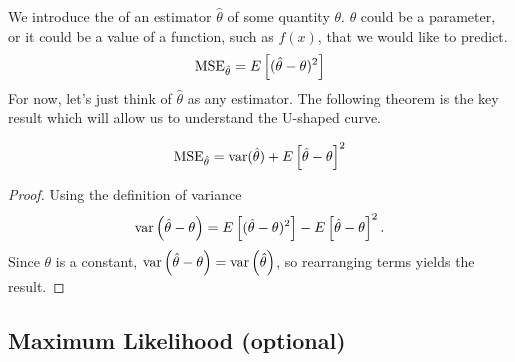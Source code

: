 We introduce the  of an estimator $\hat{\theta}$ of some quantity $\theta$. $\theta$ could be a parameter, or it could be a value of a function, such as $f(x)$, that we would like to predict. 
\begin{equation}\label{eq:mse}
{\rm MSE}_{\hat{\theta}}= E\left[(\hat{\theta}- \theta)^2\right]
\end{equation}
 For now, let's just think of $\hat{\theta}$ as any estimator. 
The following theorem is the key result which will allow us to understand the U-shaped curve. 
\begin{thm}
\begin{equation}\label{eq:biasvar}
{\rm MSE}_{\hat{\theta}} = {\rm var}(\hat{\theta}) + E\left[\hat{\theta}-\theta\right]^2
\end{equation}
\end{thm}
\begin{proof}
Using the definition of variance 
\begin{equation*}
{\rm var}\left(\hat{\theta}-\theta\right) = E\left[(\hat{\theta}-\theta)^2\right] - E\left[\hat{\theta}-\theta\right]^2. 
\end{equation*}
Since $\theta$ is a constant, ${\rm var}\left(\hat{\theta}-\theta\right)= {\rm var}\left(\hat{\theta}\right)$, so 
rearranging terms yields the result. 
\end{proof}


\subsection{Maximum Likelihood (optional)}

